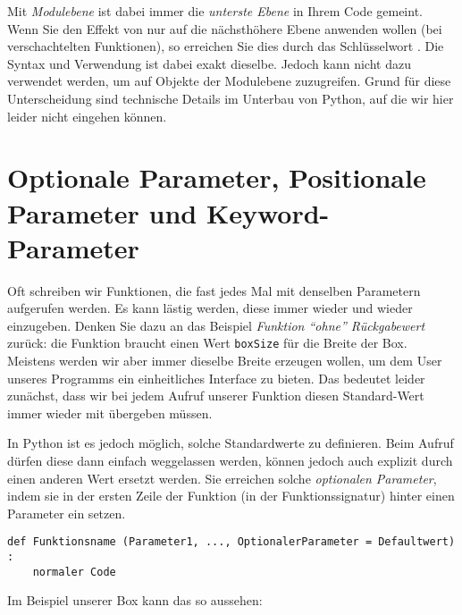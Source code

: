Mit \emph{Modulebene} ist dabei immer die \emph{unterste Ebene} in Ihrem Code gemeint. Wenn Sie den Effekt von  nur auf die nächsthöhere Ebene anwenden wollen (\eg bei verschachtelten Funktionen), so erreichen Sie dies durch das Schlüsselwort . Die Syntax und Verwendung ist dabei exakt dieselbe. Jedoch kann  nicht dazu verwendet werden, um auf Objekte der Modulebene zuzugreifen. Grund für diese Unterscheidung sind technische Details im Unterbau von Python, auf die wir hier leider nicht eingehen können.

\section{Optionale Parameter, Positionale Parameter und Keyword-Parameter}
Oft schreiben wir Funktionen, die fast jedes Mal mit denselben Parametern aufgerufen werden. Es kann lästig werden, diese immer wieder und wieder einzugeben. Denken Sie dazu an das Beispiel \emph{Funktion \enquote{ohne} Rückgabewert} zurück: die Funktion  braucht einen Wert \texttt{boxSize} für die Breite der Box. Meistens werden wir aber immer dieselbe Breite erzeugen wollen, um dem User unseres Programms ein einheitliches Interface zu bieten. Das bedeutet leider zunächst, dass wir bei jedem Aufruf unserer Funktion  diesen Standard-Wert immer wieder mit übergeben müssen.

In Python ist es jedoch möglich, solche Standardwerte zu definieren. Beim Aufruf dürfen diese dann einfach weggelassen werden, können jedoch auch explizit durch einen anderen Wert ersetzt werden. Sie erreichen solche \emph{optionalen Parameter}, indem sie in der ersten Zeile der Funktion (in der Funktionssignatur) hinter einen Parameter ein   setzen.

\begin{codebox}
\begin{verbatim}
def Funktionsname (Parameter1, ..., OptionalerParameter = Defaultwert) :
    normaler Code
\end{verbatim}
\end{codebox}

Im Beispiel unserer Box kann das so aussehen:

